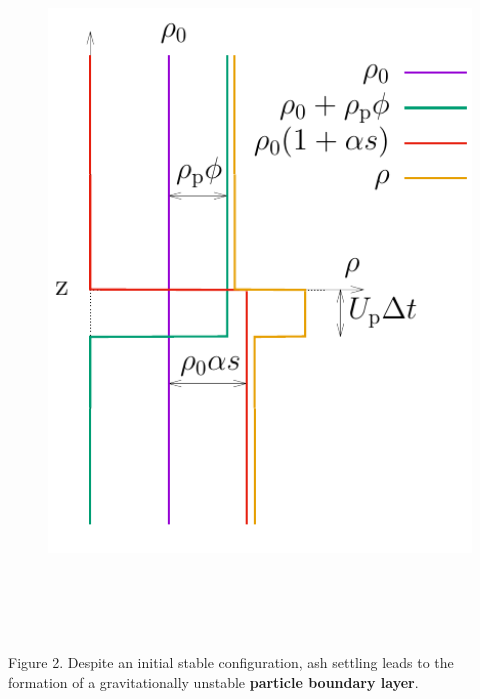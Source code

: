 \documentclass[final]{beamer} %
\begin{document}
\begin{frame}[t]
\begin{columns}[t]
\begin{column}{0.3\paperwidth}
\begin{columns}[t]
        \begin{column}{0.17\paperwidth}
          
          \begin{figure}
            \includegraphics[height=18cm]{unstable_config.pdf}
          \end{figure}
        \end{column}
        
      \end{columns}

      \vspace{-1cm}

      \centering \footnotesize Figure 2. Despite an initial stable
      configuration, ash settling leads to the formation of a gravitationally
      unstable \textbf{particle boundary layer}.

      \vspace{1cm}

      
    \end{column}
    

\end{columns}
\end{frame}
\end{document}

